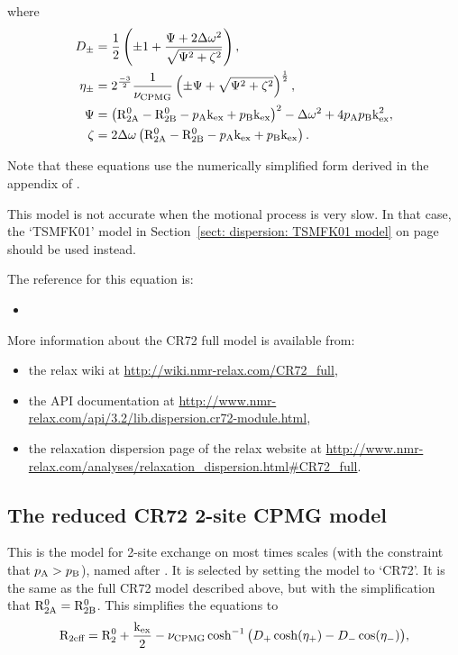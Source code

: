 where
\begin{align}
    D_{\pm}    &= \frac{1}{2} \left( \pm1 + \frac{\Psi + 2\Delta\omega^2}{\sqrt{\Psi^2 + \zeta^2}} \right) , \\
    \eta_{\pm} &= 2^{\frac{-3}{2}}\frac{1}{\nu_{\textrm{CPMG}}} \left( \pm\Psi + \sqrt{\Psi^2 + \zeta^2} \right)^{\frac{1}{2}} , \\
    \Psi       &= \left( \mathrm{R}_{\mathrm{2A}}^0 - \mathrm{R}_{\mathrm{2B}}^0 - p_{\textrm{A}}\textrm{k}_{\textrm{ex}} + p_{\textrm{B}}\textrm{k}_{\textrm{ex}} \right)^2 - \Delta\omega^2 + 4p_{\textrm{A}}p_{\textrm{B}}\textrm{k}_{\textrm{ex}}^2 , \\
    \zeta      &= 2\Delta\omega \left( \mathrm{R}_{\mathrm{2A}}^0 - \mathrm{R}_{\mathrm{2B}}^0 - p_{\textrm{A}}\textrm{k}_{\textrm{ex}} + p_{\textrm{B}}\textrm{k}_{\textrm{ex}} \right).
\end{align}

Note that these equations use the numerically simplified form derived in the appendix of \citet{Davis94}.

This model is not accurate when the motional process is very slow.
In that case, the `TSMFK01' model in Section~\ref{sect: dispersion: TSMFK01 model} on page~\pageref{sect: dispersion: TSMFK01 model} should be used instead.

The reference for this equation is:
\begin{itemize}
  \item {}
\end{itemize}

More information about the CR72 full model is available from:
\begin{itemize}
  \item the relax wiki at \url{http://wiki.nmr-relax.com/CR72\_full},
  \item the API documentation at \url{http://www.nmr-relax.com/api/3.2/lib.dispersion.cr72-module.html},
  \item the relaxation dispersion page of the relax website at \url{http://www.nmr-relax.com/analyses/relaxation\_dispersion.html#CR72\_full}.
\end{itemize}



\subsection{The reduced CR72 2-site CPMG model}
\label{sect: dispersion: CR72 model}

This is the model for 2-site exchange on most times scales (with the constraint that $p_{\textrm{A}} > p_{\textrm{B}}$), named after \citet{CarverRichards72}.
It is selected by setting the model to `CR72'.
It is the same as the full CR72 model described above, but with the simplification that $\mathrm{R}_{\mathrm{2A}}^0 = \mathrm{R}_{\mathrm{2B}}^0$.
This simplifies the equations to
\begin{equation}
    \mathrm{R}_{\textrm{2eff}} = \mathrm{R}_2^0 + \frac{\textrm{k}_{\textrm{ex}}}{2} - \nu_{\textrm{CPMG}}\cosh^{-1} \big( D_+\cosh(\eta_+) - D_-\cos(\eta_-) \big) ,
\end{equation}

